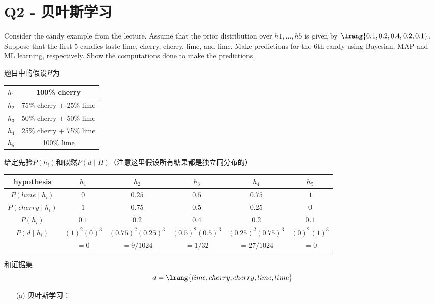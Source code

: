 \documentclass[a4paper, 11pt]{article}
\begin{document}
\section{Q2 - 贝叶斯学习}
\begin{question}\normalfont
Consider the candy example from the lecture. Assume that the prior distribution over $h1, \ldots, h5$ is given by $\lrang{0.1, 0.2, 0.4, 0.2, 0.1}$. Suppose that the first 5 candies taste lime, cherry, cherry, lime, and lime. Make predictions for the 6th candy using Bayesian, MAP and ML learning, respectively. Show
the computations done to make the predictions.
\end{question}
\begin{answer}
    题目中的假设$H$为
    \begin{center}
        \begin{tabular}{|c|c|}\hline
            $h_1$ & 100\% cherry\\\hline
            $h_2$ & 75\% cherry + 25\%  lime\\\hline
            $h_3$ & 50\% cherry + 50\% lime\\\hline
            $h_4$ & 25\% cherry + 75\% lime\\\hline
            $h_5$ & 100\% lime\\\hline
        \end{tabular}
    \end{center}
    给定先验$P(h_i)$和似然$P(d\mid H)$（注意这里假设所有糖果都是独立同分布的）
    \begin{center}
    \begin{tabular}{|c|c|c|c|c|c|}\hline
        hypothesis & $h_1$ & $h_2$ & $h_3$ & $h_4$ & $h_5$\\\hline
        $P(lime\mid h_i)$ & $0$ & $0.25$ & $0.5$ & $0.75$ & $1$\\\hline
        $P(cherry\mid h_i)$ & $1$ & $0.75$ & $0.5$ & $0.25$ & $0$\\\hline
        $P(h_i)$ & $0.1$ & $0.2$ & $0.4$ & 0.2 & $0.1$\\\hline
        $P(d\mid h_i)$ & $(1)^2(0)^3$ & $(0.75)^2(0.25)^3$ & $(0.5)^2(0.5)^3$ & $(0.25)^2(0.75)^3$ & $(0)^2(1)^3$\\
        & $=0$ & $=9/1024$ & $=1/32$ & $=27/1024$ & $=0$\\\hline
    \end{tabular}
    \end{center}
    和证据集
    \[d=\lrang{lime, cherry, cherry, lime, lime}\]
\begin{itemize}
    \item [(a)] 贝叶斯学习：

\end{itemize}
\end{answer}
\end{document}
